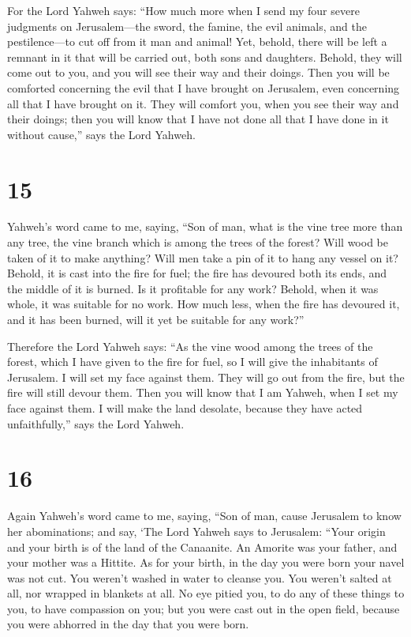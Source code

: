  For the Lord Yahweh says: ``How much more when I send my
four severe judgments on Jerusalem---the sword, the famine, the evil
animals, and the pestilence---to cut off from it man and animal!
 Yet, behold, there will be left a remnant in it that will
be carried out, both sons and daughters. Behold, they will come out to
you, and you will see their way and their doings. Then you will be
comforted concerning the evil that I have brought on Jerusalem, even
concerning all that I have brought on it.  They will
comfort you, when you see their way and their doings; then you will know
that I have not done all that I have done in it without cause,'' says
the Lord Yahweh.

\hypertarget{section-13}{%
\section{15}\label{section-13}}

 Yahweh's word came to me, saying,  ``Son of
man, what is the vine tree more than any tree, the vine branch which is
among the trees of the forest?  Will wood be taken of it to
make anything? Will men take a pin of it to hang any vessel on it?
 Behold, it is cast into the fire for fuel; the fire has
devoured both its ends, and the middle of it is burned. Is it profitable
for any work?  Behold, when it was whole, it was suitable
for no work. How much less, when the fire has devoured it, and it has
been burned, will it yet be suitable for any work?''

 Therefore the Lord Yahweh says: ``As the vine wood among
the trees of the forest, which I have given to the fire for fuel, so I
will give the inhabitants of Jerusalem.  I will set my face
against them. They will go out from the fire, but the fire will still
devour them. Then you will know that I am Yahweh, when I set my face
against them.  I will make the land desolate, because they
have acted unfaithfully,'' says the Lord Yahweh.

\hypertarget{section-14}{%
\section{16}\label{section-14}}

 Again Yahweh's word came to me, saying,  ``Son
of man, cause Jerusalem to know her abominations;  and say,
`The Lord Yahweh says to Jerusalem: ``Your origin and your birth is of
the land of the Canaanite. An Amorite was your father, and your mother
was a Hittite.  As for your birth, in the day you were born
your navel was not cut. You weren't washed in water to cleanse you. You
weren't salted at all, nor wrapped in blankets at all.  No
eye pitied you, to do any of these things to you, to have compassion on
you; but you were cast out in the open field, because you were abhorred
in the day that you were born.

